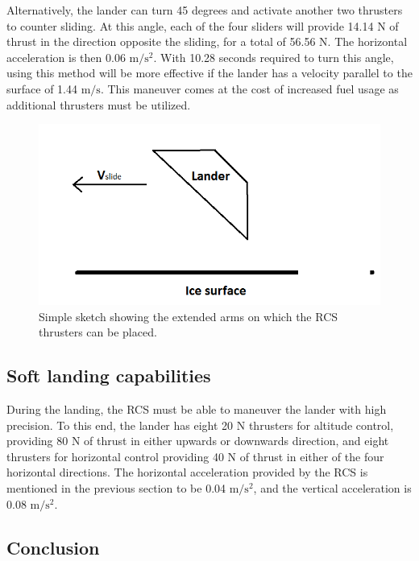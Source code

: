 Alternatively, the lander can turn 45 degrees and activate another two thrusters to counter sliding. At this angle, each of the four sliders will provide 14.14 N of thrust in the direction opposite the sliding, for a total of 56.56 N. The horizontal acceleration is then 0.06 $\mathrm{m/s^2}$. With 10.28 seconds required to turn this angle, using this method will be more effective if the lander has a velocity parallel to the surface of 1.44 $\mathrm{m/s}$. This maneuver comes at the cost of increased fuel usage as additional thrusters must be utilized.

\begin{figure}[htb]
\begin{center}
\includegraphics[scale=0.8]{figures/RCS/Lunar_slide_angle}
\caption{Simple sketch showing the extended arms on which the RCS thrusters can be placed.}
\label{fig:lunar_slide_angle}
\end{center}
\end{figure}


\subsection{Soft landing capabilities}

During the landing, the RCS must be able to maneuver the lander with high precision. To this end, the lander has eight 20 N thrusters for altitude control, providing 80 N of thrust in either upwards or downwards direction, and eight thrusters for horizontal control providing 40 N of thrust in either of the four horizontal directions. The horizontal acceleration provided by the RCS is mentioned in the previous section to be 0.04 $\mathrm{m/s^2}$, and the vertical acceleration is 0.08 $\mathrm{m/s^2}$.

\subsection{Conclusion}

